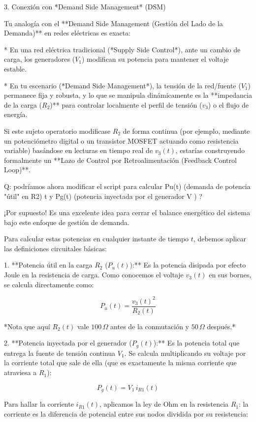 \documentclass[11pt, a4paper]{article}
\theoremstyle{definition}
\theoremstyle{plain}
\theoremstyle{plain}
\theoremstyle{remark}
\theoremstyle{remark}
\theoremstyle{remark}
\begin{document}
3. Conexión con *Demand Side Management* (DSM)

Tu analogía con el **Demand Side Management (Gestión del Lado de la Demanda)** en redes eléctricas es exacta:

* En una red eléctrica tradicional (*Supply Side Control*), ante un cambio de carga, los generadores ($V_1$) modifican su potencia para mantener el voltaje estable.

* En tu escenario (*Demand Side Management*), la tensión de la red/fuente ($V_1$) permanece fija y robusta, y lo que se manipula dinámicamente es la **impedancia de la carga ($R_2$)** para controlar localmente el perfil de tensión ($v_3$) o el flujo de energía.

Si este sujeto operatorio modificase $R_2$ de forma continua (por ejemplo, mediante un potenciómetro digital o un transistor MOSFET actuando como resistencia variable) basándose en lecturas en tiempo real de $v_3(t)$, estarías construyendo formalmente un **Lazo de Control por Retroalimentación (Feedback Control Loop)**.


{\color{red} Q: podríamos ahora modificar el script para calcular Pu(t) (demanda de potencia "útil" en R2) t y Pg(t) (potencia inyectada por el generador V ) ? 
}

¡Por supuesto! Es una excelente idea para cerrar el balance energético del sistema bajo este enfoque de gestión de demanda.

Para calcular estas potencias en cualquier instante de tiempo $t$, debemos aplicar las definiciones circuitales básicas:

1. **Potencia útil en la carga $R_2$ ($P_u(t)$):** Es la potencia disipada por efecto Joule en la resistencia de carga. Como conocemos el voltaje $v_3(t)$ en sus bornes, se calcula directamente como:

$$P_u(t) = \frac{v_3(t)^2}{R_2(t)}$$



*Nota que aquí $R_2(t)$ vale $100\,\Omega$ antes de la conmutación y $50\,\Omega$ después.*


2. **Potencia inyectada por el generador ($P_g(t)$):** Es la potencia total que entrega la fuente de tensión continua $V_1$. Se calcula multiplicando su voltaje por la corriente total que sale de ella (que es exactamente la misma corriente que atraviesa a $R_1$):

$$P_g(t) = V_1 \,  i_{R1}(t)$$



Para hallar la corriente $i_{R1}(t)$, aplicamos la ley de Ohm en la resistencia $R_1$: la corriente es la diferencia de potencial entre sus nodos dividida por su resistencia:
\end{document}
